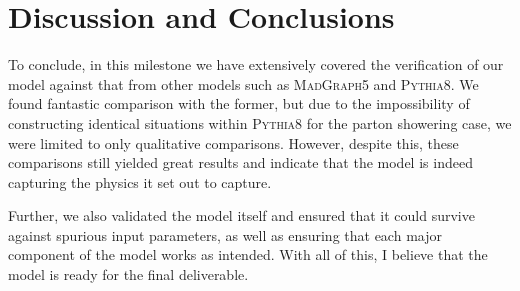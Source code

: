 \section{Discussion and Conclusions}

To conclude, in this milestone we have extensively covered the verification of our model against that from other models such as \textsc{MadGraph5} and \textsc{Pythia8}. We found fantastic comparison with the former, but due to the impossibility of constructing identical situations within \textsc{Pythia8} for the parton showering case, we were limited to only qualitative comparisons. However, despite this, these comparisons still yielded great results and indicate that the model is indeed capturing the physics it set out to capture.

Further, we also validated the model itself and ensured that it could survive against spurious input parameters, as well as ensuring that each major component of the model works as intended. With all of this, I believe that the model is ready for the final deliverable.

